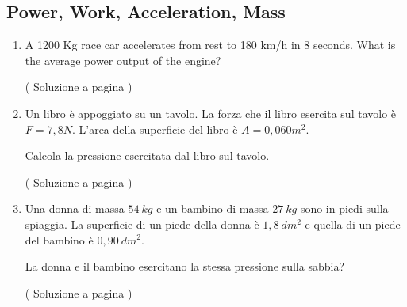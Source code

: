 \subsection{Power, Work, Acceleration, Mass} \label{sec:powoama}

\setcounter{equation}{0}
\begin{enumerate}
\item 
A 1200 Kg race car accelerates from rest to %
180 km/h in %
8 seconds.  What is the average power output of the engine?
\label{ex_f_6} 

( Soluzione a pagina \pageref{sol_f_6} )

\item \label{ex_f_7} 
Un libro è appoggiato su un tavolo. La forza che il libro 
esercita sul tavolo è $F=7,8 N$. L’area della superficie 
del libro è $A=0,060 m^2$.  

Calcola la pressione esercitata dal libro sul tavolo.

( Soluzione a pagina \pageref{sol_f_7} )


\item \label{ex_f_8} 

Una donna di massa $54\: kg$ e un bambino di massa $27\: kg$ sono in piedi sulla spiaggia. La superficie di un piede della donna è $1,8\: dm^2$ e quella di un piede del bambino è $0,90\: dm^2$.

La donna e il bambino esercitano la stessa pressione sulla sabbia?



( Soluzione a pagina \pageref{sol_f_8} )


\end{enumerate}


